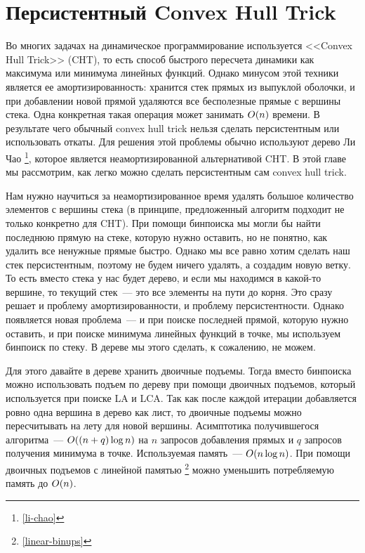 \chapter{Персистентный Convex Hull Trick} \label{persistent-cht}

Во многих задачах на динамическое программирование используется <<Convex Hull Trick>> (CHT), то есть способ быстрого пересчета динамики как максимума или минимума линейных функций. Однако минусом этой техники является ее амортизированность: хранится стек прямых из выпуклой оболочки, и при добавлении новой прямой удаляются все бесполезные прямые с вершины стека. Одна конкретная такая операция может занимать $O(n)$ времени. В результате чего обычный convex hull trick нельзя сделать персистентным или использовать откаты. Для решения этой проблемы обычно используют дерево Ли Чао \footnote{\ref{li-chao}}, которое является неамортизированной альтернативой CHT. В этой главе мы рассмотрим, как легко можно сделать персистентным сам convex hull trick.

Нам нужно научиться за неамортизированное время удалять большое количество элементов с вершины стека (в принципе, предложенный алгоритм подходит не только конкретно для CHT). При помощи бинпоиска мы могли бы найти последнюю прямую на стеке, которую нужно оставить, но не понятно, как удалить все ненужные прямые быстро. Однако мы все равно хотим сделать наш стек персистентным, поэтому не будем ничего удалять, а создадим новую ветку. То есть вместо стека у нас будет дерево, и если мы находимся в какой-то вершине, то текущий стек~--- это все элементы на пути до корня. Это сразу решает и проблему амортизированности, и проблему персистентности. Однако появляется новая проблема~--- и при поиске последней прямой, которую нужно оставить, и при поиске минимума линейных функций в точке, мы используем бинпоиск по стеку. В дереве мы этого сделать, к сожалению, не можем.

Для этого давайте в дереве хранить двоичные подъемы. Тогда вместо бинпоиска можно использовать подъем по дереву при помощи двоичных подъемов, который используется при поиске LA и LCA. Так как после каждой итерации добавляется ровно одна вершина в дерево как лист, то двоичные подъемы можно пересчитывать на лету для новой вершины. Асимптотика получившегося алгоритма~--- $O((n + q) \log n)$ на $n$ запросов добавления прямых и $q$ запросов получения минимума в точке. Используемая память~--- $O(n \log n)$. При помощи двоичных подъемов с линейной памятью \footnote{\ref{linear-binups}} можно уменьшить потребляемую память до $O(n)$.

